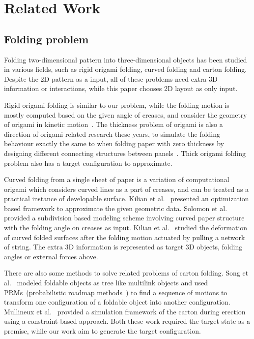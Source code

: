 \section{Related Work}\label{sec:relatedwork}
\subsection{Folding problem}
Folding two-dimensional pattern into three-dimensional objects has been studied in various fields, such as rigid origami folding, curved folding and carton folding. Despite the 2D pattern as a input, all of these problems need extra 3D information or interactions, while this paper chooses 2D layout as only input.

Rigid origami folding is similar to our problem, while the folding motion is mostly computed based on the given angle of creases, and consider the geometry of origami in kinetic motion~\cite{tachi2009simulation,tachigeometric}. The thickness problem of origami is also a direction of origami related research these years, to simulate the folding behaviour exactly the same to when folding paper with zero thickness by designing different connecting structures between panels~\cite{chen2015origami,2016arXiv160105747K,tachi2011rigid}. Thick origami folding problem also has a target configuration to approximate.

Curved folding from a single sheet of paper is a variation of computational origami which considers curved lines as a part of creases, and can be treated as a practical instance of developable surface. Kilian et al.~\cite{Kilian:2008:CF:1360612.1360674} presented an optimization based framework to approximate the given geometric data. Solomon et al.~\cite{Solomon:2012:FDS:2346796.2346817} provided a subdivision based modeling scheme involving curved paper structure with the folding angle on creases as input. Kilian et al.~\cite{Kilian:2017:SAC:3087678.3015460} studied the deformation of curved folded surfaces after the folding motion actuated by pulling a network of string. The extra 3D information is represented as target 3D objects, folding angles or external forces above.

There are also some methods to solve related problems of carton folding. 
Song et al.~\cite{Song:2000:MPA:892954} modeled foldable objects as tree like multilink objects and used PRMs~(probabilistic roadmap methods~\cite{Kavraki:1994:PRP:891758}) to find a sequence of motions to transform one configuration of a foldable object into another configuration. 
Mullineux et al.~\cite{Mullineux:2010:CSC:1739328.1739673} provided a simulation framework of the carton during erection using a constraint-based approach. Both these work required the target state as a premise, while our work aim to generate the target configuration.

